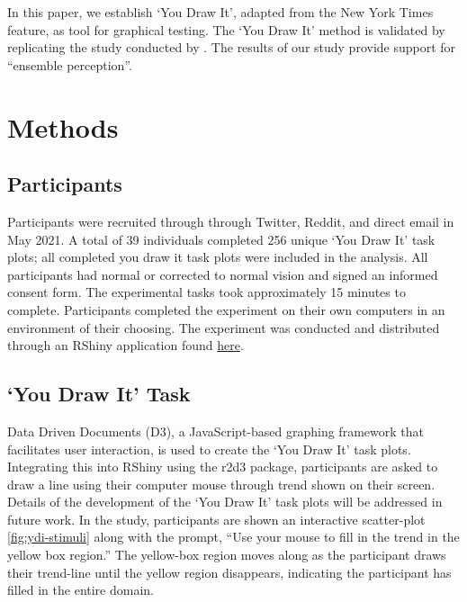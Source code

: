 \documentclass[12pt]{article}
\begin{document}
In this paper, we establish `You Draw It', adapted from the New York
Times feature, as tool for graphical testing. The `You Draw It' method
is validated by replicating the study conducted by
\citet{mosteller1981eye}. The results of our study provide support for
``ensemble perception''.

\hypertarget{methods}{%
\section{Methods}\label{methods}}

\hypertarget{participants}{%
\subsection{Participants}\label{participants}}

Participants were recruited through through Twitter, Reddit, and direct
email in May 2021. A total of 39 individuals completed 256 unique `You
Draw It' task plots; all completed you draw it task plots were included
in the analysis. All participants had normal or corrected to normal
vision and signed an informed consent form. The experimental tasks took
approximately 15 minutes to complete. Participants completed the
experiment on their own computers in an environment of their choosing.
The experiment was conducted and distributed through an RShiny
application found
\href{https://shiny.srvanderplas.com/you-draw-it/}{here}.

\hypertarget{you-draw-it-task}{%
\subsection{`You Draw It' Task}\label{you-draw-it-task}}

Data Driven Documents (D3), a JavaScript-based graphing framework that
facilitates user interaction, is used to create the `You Draw It' task
plots. Integrating this into RShiny using the r2d3 package, participants
are asked to draw a line using their computer mouse through trend shown
on their screen. Details of the development of the `You Draw It' task
plots will be addressed in future work. In the study, participants are
shown an interactive scatter-plot \cref{fig:ydi-stimuli} along with the
prompt, ``Use your mouse to fill in the trend in the yellow box
region.'' The yellow-box region moves along as the participant draws
their trend-line until the yellow region disappears, indicating the
participant has filled in the entire domain.
\end{document}
